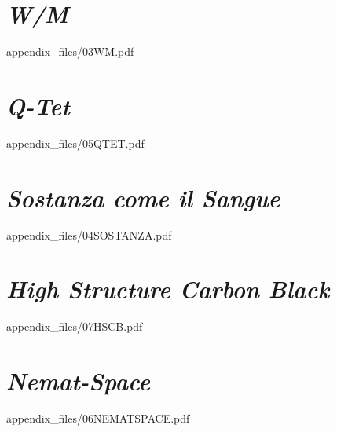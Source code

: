 
\chapter{\textit{W/M}}

        
            {appendix_files/03WM.pdf}
    

\chapter{\textit{Q-Tet}}

        
            {appendix_files/05QTET.pdf}
    

\chapter{\textit{Sostanza come il Sangue}}
    
        
            {appendix_files/04SOSTANZA.pdf}
    

\chapter{\textit{High Structure Carbon Black}}

        
            {appendix_files/07HSCB.pdf}
    

\chapter{\textit{Nemat-Space}}

        
            {appendix_files/06NEMATSPACE.pdf}
    

